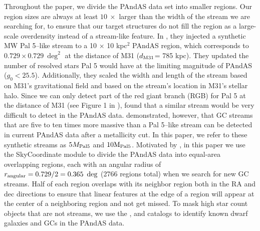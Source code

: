 \documentclass[twocolumn]{aastex631}
\begin{document}
Throughout the paper, we divide the PAndAS data set into smaller regions. Our region sizes are always at least $10~ \times$ larger than the width of the stream we are searching for, to ensure that our target structures do not fill the region as a large-scale overdensity instead of a stream-like feature. In , they injected a synthetic MW Pal 5--like stream to a 10 $\times$ 10 kpc$^2$ PAndAS region, which corresponds to $0.729 \times 0.729~ \deg^2$ at the distance of M31 ($d_{\rm M31}$= 785 kpc).  They updated the number of resolved stars Pal 5 would have at the limiting magnitude of PAndAS ($g_0 < 25.5$). 
Additionally, they scaled the width and length of the stream based on M31's gravitational field and based on the stream's location in M31's stellar halo. Since we can only detect part of the red giant branch (RGB) for Pal 5 at the distance of M31 (see Figure 1 in ),  found that a similar stream would be very difficult to detect in the PAndAS data.  demonstrated, however, that GC streams that are five to ten times more massive than a Pal 5--like stream can be detected in current PAndAS data after a metallicity cut. In this paper, we refer to these synthetic streams as $5{M}_{\rm Pal 5}$ and $10{\rm M}_{\rm Pal 5}$. Motivated by , in this paper we use the \citet{astropy13, astropy18} SkyCoordinate module to divide the PAndAS data into equal-area overlapping regions, each with an angular radius of $r_{\rm angular} = 0.729/2 = 0.365~ \deg$ (2766 regions total) when we search for new GC streams. 
Half of each region overlaps with its neighbor region both in the RA and dec directions %
to ensure that linear features at the edge of a region will appear at the center of a neighboring region and not get missed.
To mask high star count objects that are not streams, we use the \citet{martin17}, \citet{McConnachie19} and \citet{huxor14} catalogs to identify known dwarf galaxies and GCs in the PAndAS data. 
\end{document}

